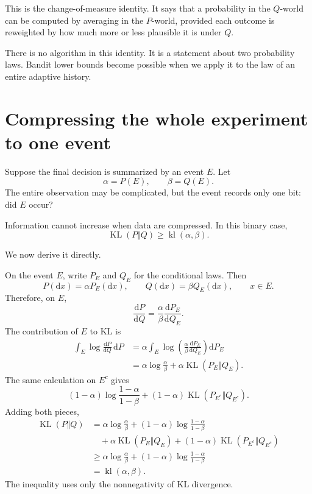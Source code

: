 \documentclass[en,nofont,11pt]{elegantbook}
\newcommand{\KL}{\operatorname{KL}}
\newcommand{\kl}{\operatorname{kl}}
\newcommand{\dd}{\mathrm{d}}
\begin{document}
This is the change-of-measure identity. It says that a probability in the $Q$-world can be computed by averaging in the $P$-world, provided each outcome is reweighted by how much more or less plausible it is under $Q$.

There is no algorithm in this identity. It is a statement about two probability laws. Bandit lower bounds become possible when we apply it to the law of an entire adaptive history.

\section{Compressing the whole experiment to one event}

Suppose the final decision is summarized by an event $E$. Let
\[
\alpha=P(E),
\qquad
\beta=Q(E).
\]
The entire observation may be complicated, but the event records only one bit: did $E$ occur?

Information cannot increase when data are compressed. In this binary case,
\begin{equation}
\boxed{
\KL(P\Vert Q)\geq \kl(\alpha,\beta).
}
\label{eq:binary-data-processing}
\end{equation}

We now derive it directly.

On the event $E$, write $P_E$ and $Q_E$ for the conditional laws. Then
\[
P(\dd x)=\alpha P_E(\dd x),
\qquad
Q(\dd x)=\beta Q_E(\dd x),
\qquad x\in E.
\]
Therefore, on $E$,
\[
\frac{\dd P}{\dd Q}
=
\frac{\alpha}{\beta}
\frac{\dd P_E}{\dd Q_E}.
\]
The contribution of $E$ to KL is
\begin{align*}
\int_E \log\frac{\dd P}{\dd Q}\,\dd P
&=
\alpha\int_E
\log\left(
\frac{\alpha}{\beta}
\frac{\dd P_E}{\dd Q_E}
\right)\dd P_E\\
&=
\alpha\log\frac{\alpha}{\beta}
+
\alpha\KL(P_E\Vert Q_E).
\end{align*}
The same calculation on $E^c$ gives
\[
(1-\alpha)\log\frac{1-\alpha}{1-\beta}
+
(1-\alpha)\KL(P_{E^c}\Vert Q_{E^c}).
\]
Adding both pieces,
\begin{align*}
\KL(P\Vert Q)
&=
\alpha\log\frac{\alpha}{\beta}
+(1-\alpha)\log\frac{1-\alpha}{1-\beta}\\
&\quad
+
\alpha\KL(P_E\Vert Q_E)
+(1-\alpha)\KL(P_{E^c}\Vert Q_{E^c})\\
&\geq
\alpha\log\frac{\alpha}{\beta}
+(1-\alpha)\log\frac{1-\alpha}{1-\beta}\\
&=
\kl(\alpha,\beta).
\end{align*}
The inequality uses only the nonnegativity of KL divergence.
\end{document}
